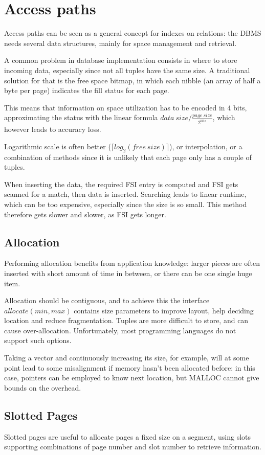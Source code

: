 \section{Access paths}
Access paths can be seen as a general concept for indexes on relations: the DBMS needs several data structures, mainly for space management and retrieval.

A common problem in database implementation consists in where to store incoming data, especially since not all tuples have the same size. A traditional solution for that is the free space bitmap, in which each nibble (an array of half a byte per page) indicates the fill status for each page.

This means that information on space utilization has to be encoded in 4 bits, approximating the status with the linear formula $data\ size / \frac{page\ size}{2^{bits}}$, which however leads to accuracy loss.

Logarithmic scale is often better ($\lceil log_2(free\ size)\rceil$), or interpolation, or a combination of methods since it is unlikely that each page only has a couple of tuples.

When inserting the data, the required FSI entry is computed and FSI gets scanned for a match, then data is inserted. Searching leads to linear runtime, which can be too expensive, especially since the size is so small. This method therefore gets slower and slower, as FSI gets longer. 

\subsection{Allocation}
Performing allocation benefits from application knowledge: larger pieces are often inserted with short amount of time in between, or there can be one single huge item.

Allocation should be contiguous, and to achieve this the interface $allocate(min, max)$ contains size parameters to improve layout, help deciding location and reduce fragmentation. Tuples are more difficult to store, and can cause over-allocation. Unfortunately, most programming languages do not support such options. 

Taking a vector and continuously increasing its size, for example, will at some point lead to some misalignment if memory hasn't been allocated before: in this case, pointers can be employed to know next location, but MALLOC cannot give bounds on the overhead. 

\subsection{Slotted Pages}
Slotted pages are useful to allocate pages a fixed size on a segment, using slots supporting combinations of page number and slot number to retrieve information. 

